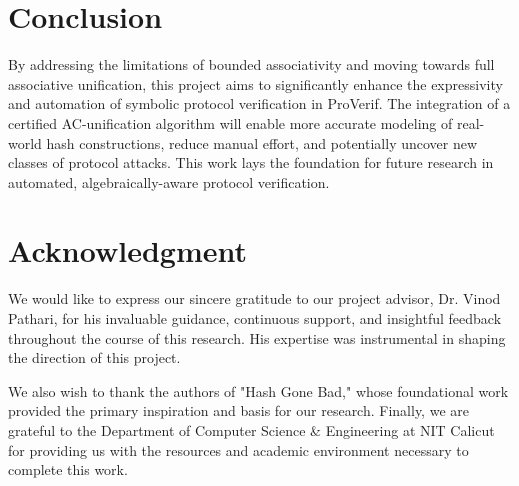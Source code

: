 \documentclass[journal]{IEEEtran}
\begin{document}
\section{Conclusion}
By addressing the limitations of bounded associativity \cite{cheval2023hash} and moving towards full associative unification, this project aims to significantly enhance the expressivity and automation of symbolic protocol verification in ProVerif. The integration of a certified AC-unification algorithm \cite{ayala2024certified} will enable more accurate modeling of real-world hash constructions, reduce manual effort, and potentially uncover new classes of protocol attacks. This work lays the foundation for future research in automated, algebraically-aware protocol verification.



\section*{Acknowledgment}

We would like to express our sincere gratitude to our project advisor, Dr. Vinod Pathari, for his invaluable guidance, continuous support, and insightful feedback throughout the course of this research. His expertise was instrumental in shaping the direction of this project.

We also wish to thank the authors of "Hash Gone Bad," \cite{cheval2023hash} whose foundational work provided the primary inspiration and basis for our research. Finally, we are grateful to the Department of Computer Science \& Engineering at NIT Calicut for providing us with the resources and academic environment necessary to complete this work.


\ifCLASSOPTIONcaptionsoff
  \newpage
\fi




\end{document}
